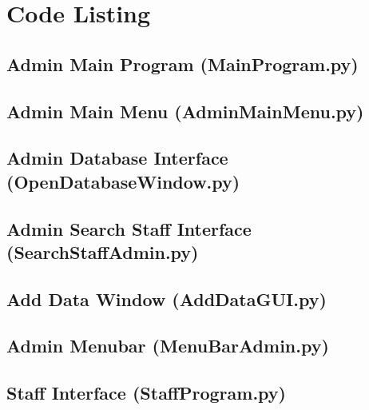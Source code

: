 \section{Code Listing}
\begin{landscape}

\begin{footnotesize}

\newpage
\subsection{Admin Main Program (MainProgram.py)} \label{MP}

\newpage
\subsection{Admin Main Menu (AdminMainMenu.py)}\label{AMM}

\newpage
\subsection{Admin Database Interface (OpenDatabaseWindow.py)}\label{ODW}

\newpage
\subsection{Admin Search Staff Interface (SearchStaffAdmin.py)}\label{SSA}

\newpage
\subsection{Add Data Window (AddDataGUI.py)}\label{ADGUI}

\newpage
\subsection{Admin Menubar (MenuBarAdmin.py)}\label{MBA}

\newpage
\subsection{Staff Interface (StaffProgram.py)}\label{SP}


\end{footnotesize}
\end{landscape}

